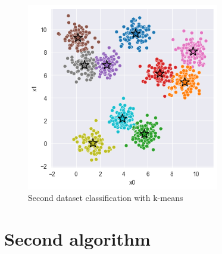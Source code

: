 \documentclass{article}
\begin{document}
\begin{figure}[h]
    \centering
    \includegraphics[width=0.75\textwidth]{kmeans_data2.png}
    \caption{Second dataset classification with k-means}
    \label{fig:dataset2}
\end{figure}


\section{Second algorithm}
\end{document}
